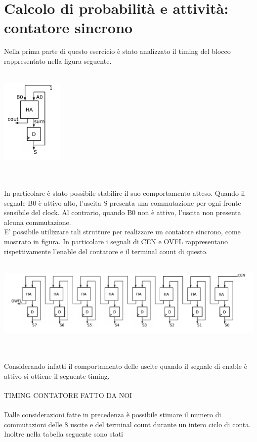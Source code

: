 \documentclass[10pt,  english, makeidx, a4paper, titlepage, oneside]{book}
\begin{document}
\section{Calcolo di probabilità e attività: contatore sincrono}
Nella prima parte di questo esercicio è stato analizzato il timing del blocco 
rappresentato nella figura seguente.
\\\\
\centerline{\includegraphics[width=3cm]{./img/Lab_1/Es_5/Sync_FA.png}}
\\\\
In particolare è stato possibile stabilire il suo comportamento atteso. 
Quando il segnale B0 è attivo alto, l'uscita S presenta una commutazione 
per ogni fronte sensibile del clock. Al contrario, quando B0 non è attivo, 
l'uscita non presenta alcuna commutazione.
\\
E' possibile utilizzare tali strutture per realizzare un contatore sincrono,
come mostrato in figura. In particolare i segnali di CEN e OVFL rappresentano
rispettivamente l'enable del contatore e il terminal count di questo.
\\\\
\centerline{\includegraphics[width=20cm]{./img/Lab_1/Es_5/Counter.png}}
\\\\
Considerando infatti il comportamento delle uscite quando il segnale di 
enable è attivo si ottiene il seguente timing.
\\\\
TIMING CONTATORE FATTO DA NOI
\\\\
Dalle considerazioni fatte in precedenza è possibile stimare il numero
di commutazioni delle 8 uscite e del terminal count durante 
un intero ciclo di conta. Inoltre nella tabella seguente sono stati
\end{document}

